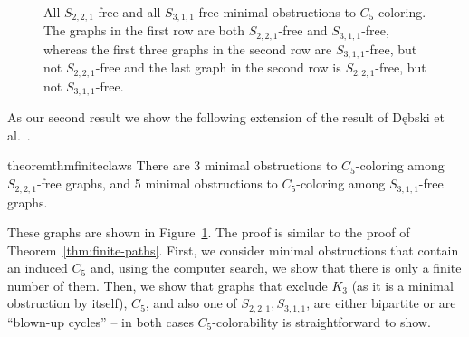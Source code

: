 \documentclass[11pt,a4paper]{article}
\theoremstyle{mystyle}
\newtheorem{theorem}{Theorem}[section]
\begin{document}
\begin{figure}[h!]
\begin{center}
 \quad
\end{center}
\caption{All $S_{2,2,1}$-free and all $S_{3,1,1}$-free minimal obstructions to $C_5$-coloring. The graphs in the first row are both $S_{2,2,1}$-free and $S_{3,1,1}$-free, whereas the first three graphs in the second row are $S_{3,1,1}$-free, but not $S_{2,2,1}$-free and the last graph in the second row is $S_{2,2,1}$-free, but not $S_{3,1,1}$-free.}
\label{fig:S221AndS311FreeObstructions}
\end{figure}

As our second result we show the following extension of the result of Dębski et al.~\cite{debski_et_al:LIPIcs.ISAAC.2022.14}.
  \begin{restatable}{theorem}{thmfiniteclaws}
  \label{thm:finite-claws}
    There are  3 minimal obstructions to $C_5$-coloring among $S_{2,2,1}$-free graphs, and
    5 minimal obstructions to $C_5$-coloring among $S_{3,1,1}$-free graphs.
  \end{restatable}
These graphs are shown in Figure~\ref{fig:S221AndS311FreeObstructions}. The proof is similar to the proof of Theorem~\ref{thm:finite-paths}.
First, we consider minimal obstructions that contain an induced $C_5$ and, using the computer search, we show that there is only a finite number of them.
Then, we show that graphs that exclude $K_3$ (as it is a minimal obstruction by itself), $C_5$, and also one of $S_{2,2,1}, S_{3,1,1}$, are either bipartite or are ``blown-up cycles'' -- in both cases $C_5$-colorability is straightforward to show.
\end{document}
